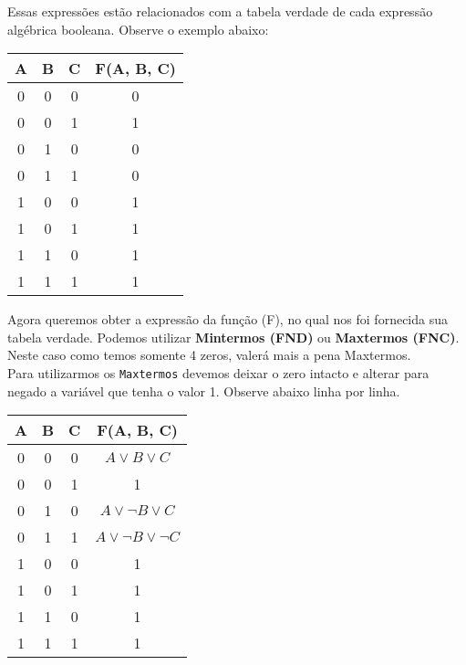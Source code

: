 \documentclass[12pt, onecolumn]{article}
\begin{document}
	Essas expressões estão relacionados com a tabela verdade de cada expressão
	algébrica booleana. Observe o exemplo abaixo: \\
	\begin{table}[ht]
                \centering
                \begin{tabular}{|c|c|c|c|}
                        \hline
			A & B & C & F(A, B, C)\\ \hline

			0 & 0 & 0 & 0 \\ \hline
			0 & 0 & 1 & 1 \\ \hline
			0 & 1 & 0 & 0 \\ \hline
			0 & 1 & 1 & 0 \\ \hline
			1 & 0 & 0 & 1 \\ \hline
			1 & 0 & 1 & 1 \\ \hline
			1 & 1 & 0 & 1 \\ \hline
			1 & 1 & 1 & 1 \\ \hline
                \end{tabular}
        \end{table}

	Agora queremos obter a expressão da função (F), no qual nos foi fornecida
	sua tabela verdade. Podemos utilizar \textbf{Mintermos (FND)} ou 
	\textbf{Maxtermos (FNC)}. Neste caso como temos somente 4 zeros, valerá 
	mais a pena Maxtermos. \\
	\newline
	Para utilizarmos os \texttt{Maxtermos} devemos deixar o zero intacto e alterar 
	para negado a variável que tenha o valor 1. Observe abaixo linha por linha. \\
	\begin{table}[ht]
                \centering
                \begin{tabular}{|c|c|c|c|}
                        \hline
                        A & B & C & F(A, B, C)\\ \hline

                        0 & 0 & 0 & $A \lor B \lor C$ \\ \hline %
                        0 & 0 & 1 & 1 \\ \hline
			0 & 1 & 0 & $A \lor \lnot{B} \lor C$ \\ \hline %
			0 & 1 & 1 & $A \lor \lnot{B} \lor \lnot{C}$ \\ \hline %
                        1 & 0 & 0 & 1 \\ \hline
                        1 & 0 & 1 & 1 \\ \hline
                        1 & 1 & 0 & 1 \\ \hline
                        1 & 1 & 1 & 1 \\ \hline
                \end{tabular}
        \end{table}
\end{document}
